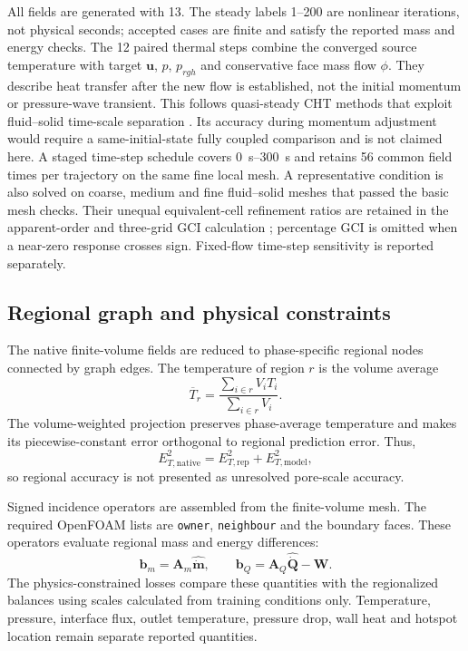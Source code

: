 All fields are generated with \OpenFOAM{} 13. The steady labels 1--200 are
nonlinear iterations, not physical seconds; accepted cases are finite and
satisfy the reported mass and energy checks.
The 12 paired thermal steps combine the converged source temperature with
target $\mathbf u$, $p$, $p_{rgh}$ and conservative face mass flow $\phi$.
They describe heat transfer after the new flow is established, not the
initial momentum or pressure-wave transient. This follows quasi-steady CHT
methods that exploit fluid--solid time-scale separation
\cite{shen2013quasisteady,gimenez2016weakly,errera2017transientcht}. Its
accuracy during momentum adjustment would require a same-initial-state fully
coupled comparison and is not claimed here. A staged time-step schedule covers
\SIrange{0}{300}{s} and retains 56 common field times per trajectory on the
same fine local mesh.
A representative condition is also solved on coarse, medium and fine fluid--solid meshes
that passed the basic mesh checks. Their unequal equivalent-cell refinement ratios
are retained in the apparent-order and three-grid GCI calculation
\cite{celik2008gci}; percentage GCI is omitted when a near-zero response
crosses sign. Fixed-flow time-step sensitivity is reported separately.

\subsection{Regional graph and physical constraints}

The native finite-volume fields are reduced to \RegionalNodes{} phase-specific
regional nodes connected by \RegionalEdges{} graph edges. The temperature of
region $r$ is the volume average
\begin{equation}
\overline T_r=\frac{\sum_{i\in r}V_iT_i}{\sum_{i\in r}V_i}.
\end{equation}
The volume-weighted projection preserves phase-average temperature and makes
its piecewise-constant error orthogonal to regional prediction error. Thus,
\begin{equation}
E_{T,\mathrm{native}}^2
=E_{T,\mathrm{rep}}^2+E_{T,\mathrm{model}}^2,
\end{equation}
so regional accuracy is not presented as unresolved pore-scale accuracy.

Signed incidence operators are assembled from the finite-volume mesh. The
required OpenFOAM lists are \texttt{owner}, \texttt{neighbour} and the boundary
faces. These operators evaluate regional mass and energy differences:
\begin{equation}
\mathbf b_m=\mathbf A_m\widehat{\dot{\mathbf m}},\qquad
\mathbf b_Q=\mathbf A_Q\widehat{\dot{\mathbf Q}}-\mathbf W.
\end{equation}
The physics-constrained losses compare these quantities with the regionalized
\OpenFOAM{} balances using scales calculated from training conditions only.
Temperature, pressure, interface flux, outlet temperature, pressure drop,
wall heat and hotspot location remain separate reported quantities.


